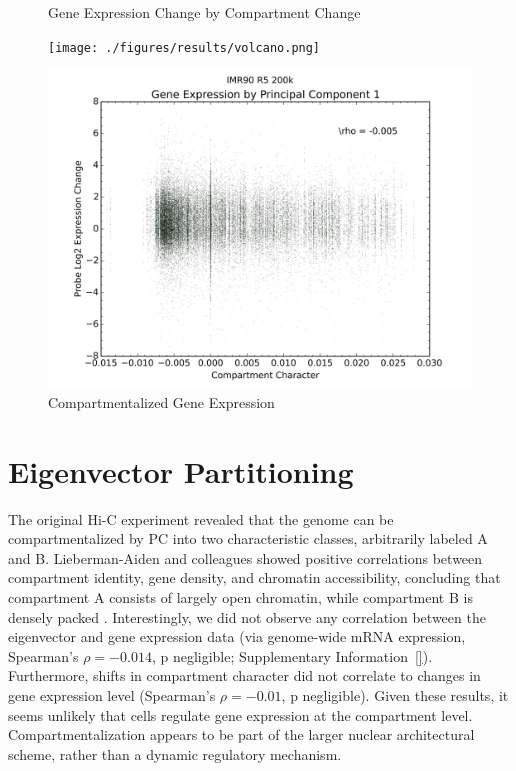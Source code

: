 \begin{figure}[thp]
  \begin{minipage}{0.45\textwidth}%
    \centering
    \caption{Gene Expression Change by Compartment Change}\label{fig:expressionChangeByCompartmentChange}
    \texttt{[image: ./figures/results/volcano.png]}
  \end{minipage}

  \begin{minipage}{0.45\textwidth}
    \centering
    \caption{Compartmentalized Gene Expression}\label{fig:expressionChangeByCompartment}
    \includegraphics[width=\textwidth]{./figures/results/compartment_ir5_200k.png}
  \end{minipage}
\end{figure}

\section*{Eigenvector Partitioning}

The original Hi-C experiment revealed that the genome can be compartmentalized by \gls{PC} into two characteristic classes, arbitrarily 
labeled A and B.  Lieberman-Aiden and colleagues showed positive correlations between compartment identity, gene density, and chromatin
accessibility, concluding that compartment A consists of largely open chromatin, while compartment B is densely packed \citep{aiden2009}.
Interestingly, we did not observe any correlation between the eigenvector and gene expression data (via genome-wide mRNA expression,
Spearman's $\rho = -0.014$, p negligible; Supplementary Information~\ref{}).  Furthermore, shifts in compartment character did not correlate to 
changes in gene expression level (Spearman's $\rho = -0.01$, p negligible).  Given these results, it seems unlikely that cells regulate
gene expression at the compartment level.  Compartmentalization appears to be part of the larger nuclear architectural scheme, rather than
a dynamic regulatory mechanism.

